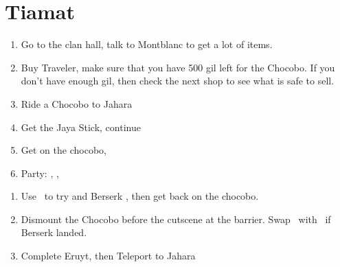 \chapter{Tiamat}

\begin{enumerate}
	\item Go to the clan hall, talk to Montblanc to get a lot of items.
	\item Buy Traveler, make sure that you have 500 gil left for the Chocobo. If you don't have enough gil, then check the next shop to see what is safe to sell.
	\item Ride a Chocobo to Jahara
	\item Get the Jaya Stick, continue
	\item Get on the chocobo, 
	\item Party: \vaan, \basch, \penelo
\end{enumerate}
\begin{liscense}
	\begin{itemize}
	\end{itemize}
\end{liscense}
\begin{enumerate}
	\item Use \penelo\ to try and Berserk \basch, then get back on the chocobo.
	\item Dismount the Chocobo before the cutscene at the barrier. Swap \basch\ with \balthier\ if Berserk landed.
	\item Complete Eruyt, then Teleport to Jahara
\end{enumerate}
